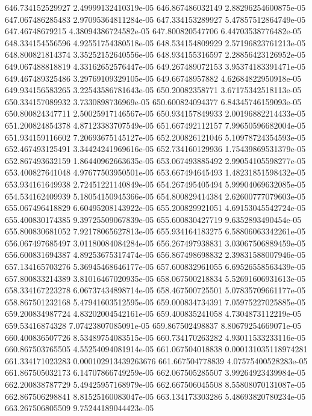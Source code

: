 {646.734152529927 2.49999132410319e-05
646.867486032149 2.88296254600875e-05
647.067486285483 2.97095364811284e-05
647.334153289927 5.47857512864749e-05
647.46748679215 4.38094386724582e-05
647.800820547706 6.44703538776482e-05
648.334154556596 4.92551754380518e-05
648.534154809929 2.57196823761213e-05
648.800821814374 3.35252152640556e-05
648.934155316597 2.28856423126952e-05
649.067488818819 4.33162652576447e-05
649.267489072153 3.95374183391471e-05
649.467489325486 3.29769109329105e-05
649.66748957882 4.62684822950918e-05
649.934156583265 3.22543586781643e-05
650.20082358771 3.67175342518113e-05
650.334157089932 3.7330898736969e-05
650.600824094377 6.84345746159093e-05
650.800824347711 2.50025917146567e-05
650.934157849933 2.00196882214433e-05
651.200824854378 4.87123383707549e-05
651.667492112157 7.99650596682004e-05
651.934159116602 7.20693675145127e-05
652.200826121046 5.10978724354593e-05
652.467493125491 3.34424241969616e-05
652.734160129936 1.75439869531379e-05
652.867493632159 1.86440962663635e-05
653.067493885492 2.99054105598277e-05
653.400827641048 4.97677503950501e-05
653.667494645493 1.48231851598432e-05
653.934161649938 2.72451221140849e-05
654.267495405494 5.99904069632085e-05
654.534162409939 5.18054150945366e-05
654.800829414384 2.62600777079603e-05
655.067496418829 6.60495208143922e-05
655.200829921051 4.69153045542724e-05
655.400830174385 9.39725509067839e-05
655.600830427719 9.6352893490454e-05
655.800830681052 7.92178065627813e-05
655.934164183275 6.58806063342261e-05
656.067497685497 3.01180084084284e-05
656.267497938831 3.03067506889459e-05
656.600831694387 4.89253675317474e-05
656.867498698832 2.39831588007946e-05
657.134165703276 5.36945468646177e-05
657.600832961055 6.69526558563439e-05
657.800833214389 3.81016467020935e-05
658.067500218834 5.52691606931613e-05
658.334167223278 6.06737434898714e-05
658.467500725501 5.07835709661177e-05
658.867501232168 5.47941603512595e-05
659.000834734391 7.05975227025885e-05
659.200834987724 4.83202004542161e-05
659.400835241058 4.7304873112219e-05
659.53416874328 7.07423807085091e-05
659.867502498837 8.80679254669071e-05
660.400836507726 8.53489754083515e-05
660.734170263282 4.93011533233116e-05
660.867503765505 4.55254094081914e-05
661.067504018838 0.000131035118974281
661.334171023283 0.000102913439263676
661.667504778839 4.07575400528283e-05
661.867505032173 6.14707866749259e-05
662.067505285507 3.99264923439984e-05
662.200838787729 5.49425957168979e-05
662.667506045508 8.55808070131087e-05
662.867506298841 8.81525160083047e-05
663.134173303286 5.48693820780234e-05
663.267506805509 9.75244189044423e-05
}
